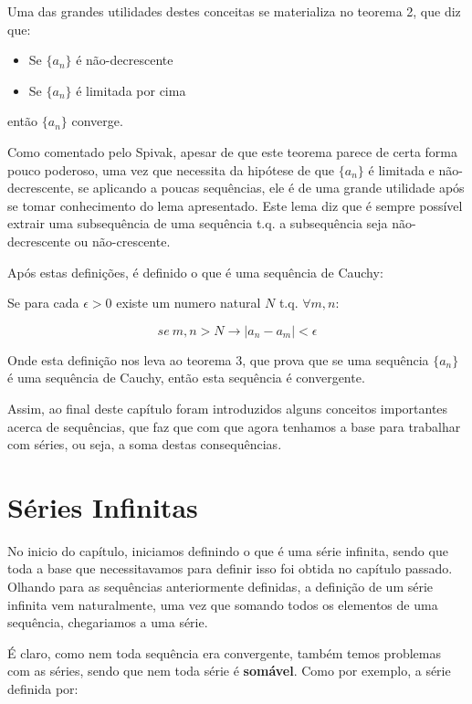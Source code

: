\documentclass[a4paper, 12pt]{article}
\begin{document}
Uma das grandes utilidades destes conceitas se materializa no teorema 2, que diz que:

\begin{itemize}
	\item Se $\{a_n\}$ é não-decrescente
	\item Se $\{a_n\}$ é limitada por cima
\end{itemize}

então $\{a_n\}$ converge.

Como comentado pelo Spivak, apesar de que este teorema parece de certa forma pouco poderoso,
uma vez que necessita da hipótese de que $\{a_n\}$ é limitada e não-decrescente, se
aplicando a poucas sequências, ele é de uma grande utilidade após se tomar conhecimento
do lema apresentado. Este lema diz que é sempre possível extrair uma subsequência de 
uma sequência t.q. a subsequência seja não-decrescente ou não-crescente.

Após estas definições, é definido o que é uma sequência de Cauchy:

Se para cada $\epsilon > 0$ existe um numero natural $N$ t.q. $\forall m,n$:

\begin{equation}
	\nonumber se\  m,n > N \to |a_n - a_m| < \epsilon
\end{equation}

Onde esta definição nos leva ao teorema 3, que prova que se uma sequência $\{a_n\}$ é uma 
sequência de Cauchy, então esta sequência é convergente.

Assim, ao final deste capítulo foram introduzidos alguns conceitos importantes acerca 
de sequências, que faz que com que agora tenhamos a base para trabalhar com séries,
ou seja, a soma destas consequências.

\newpage


\section{Séries Infinitas}

No inicio do capítulo, iniciamos definindo o que é uma série infinita, sendo que toda a base
que necessitavamos para definir isso foi obtida no capítulo passado. Olhando para as sequências
anteriormente definidas, a definição de um série infinita vem naturalmente, uma vez que
somando todos os elementos de uma sequência, chegariamos a uma série.

É claro, como nem toda sequência era convergente, também temos problemas com as séries, sendo que
nem toda série é \textbf{somável}. Como por exemplo, a série definida por:
\end{document}
